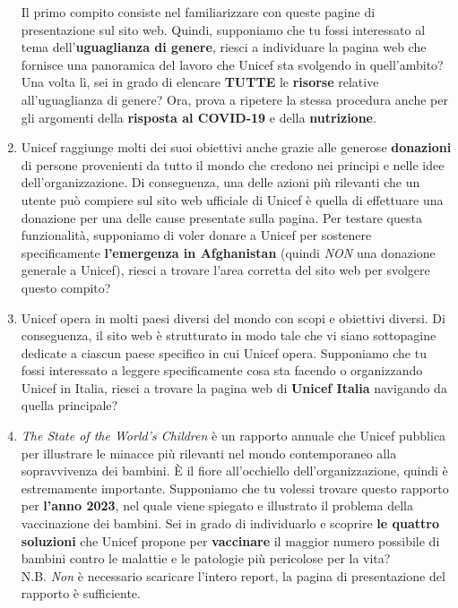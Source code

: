 \documentclass[11pt]{article}
\begin{document}
\begin{Form}
\begin{enumerate}
			
			Il primo compito consiste nel familiarizzare con queste pagine di presentazione sul sito web. Quindi, supponiamo che tu fossi interessato al tema dell'\textbf{uguaglianza di genere}, riesci a individuare la pagina web che fornisce una panoramica del lavoro che Unicef sta svolgendo in quell'ambito? Una volta lì, sei in grado di elencare \textbf{TUTTE} le \textbf{risorse} relative all'uguaglianza di genere?
			Ora, prova a ripetere la stessa procedura anche per gli argomenti della \textbf{risposta al COVID-19} e della \textbf{nutrizione}.
			
			
			\item Unicef raggiunge molti dei suoi obiettivi anche grazie alle generose \textbf{donazioni} di persone provenienti da tutto il mondo che credono nei principi e nelle idee dell'organizzazione. Di conseguenza, una delle azioni più rilevanti che un utente può compiere sul sito web ufficiale di Unicef è quella di effettuare una donazione per una delle cause presentate sulla pagina. Per testare questa funzionalità, supponiamo di voler donare a Unicef per sostenere specificamente \textbf{l'emergenza in Afghanistan} (quindi \textit{NON} una donazione generale a Unicef), riesci a trovare l'area corretta del sito web per svolgere questo compito?
			
			\item Unicef opera in molti paesi diversi del mondo con scopi e obiettivi diversi. Di conseguenza, il sito web è strutturato in modo tale che vi siano sottopagine dedicate a ciascun paese specifico in cui Unicef opera. Supponiamo che tu fossi interessato a leggere specificamente cosa sta facendo o organizzando Unicef in Italia, riesci a trovare la pagina web di \textbf{Unicef Italia} navigando da quella principale?
			
			\item \textit{The State of the World's Children} è un rapporto annuale che Unicef pubblica per illustrare le minacce più rilevanti nel mondo contemporaneo alla sopravvivenza dei bambini. È il fiore all'occhiello dell'organizzazione, quindi è estremamente importante. Supponiamo che tu volessi trovare questo rapporto per \textbf{l'anno 2023}, nel quale viene spiegato e illustrato il problema della vaccinazione dei bambini. Sei in grado di individuarlo e scoprire \textbf{le quattro soluzioni} che Unicef propone per \textbf{vaccinare} il maggior numero possibile di bambini contro le malattie e le patologie più pericolose per la vita?\\
			N.B. \textit{Non} è necessario scaricare l'intero report, la pagina di presentazione del rapporto è sufficiente.
			

\end{enumerate}
\end{Form}
\end{document}
